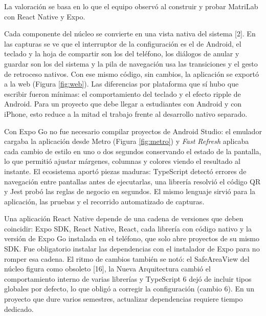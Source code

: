 \clearpage
{}

La valoración se basa en lo que el equipo observó al construir y probar MatriLab con React Native y Expo.

\vspace{0.2cm}


Cada componente del núcleo se convierte en una vista nativa del sistema [2]. En las capturas se ve que el interruptor de la configuración es el de Android, el teclado y la hoja de compartir son los del teléfono, los diálogos de anular y guardar son los del sistema y la pila de navegación usa las transiciones y el gesto de retroceso nativos. Con ese mismo código, sin cambios, la aplicación se exportó a la web (Figura \ref{fig:web}). Las diferencias por plataforma que sí hubo que escribir fueron mínimas: el comportamiento del teclado y el efecto ripple de Android. Para un proyecto que debe llegar a estudiantes con Android y con iPhone, esto reduce a la mitad el trabajo frente al desarrollo nativo separado.


Con Expo Go no fue necesario compilar proyectos de Android Studio: el emulador cargaba la aplicación desde Metro (Figura \ref{fig:metro}) y \textit{Fast Refresh} aplicaba cada cambio de estilo en uno o dos segundos conservando el estado de la pantalla, lo que permitió ajustar márgenes, columnas y colores viendo el resultado al instante. El ecosistema aportó piezas maduras: TypeScript detectó errores de navegación entre pantallas antes de ejecutarlas, una librería resolvió el código QR y Jest probó las reglas de negocio en segundos. El mismo lenguaje sirvió para la aplicación, las pruebas y el recorrido automatizado de capturas.

\vspace{0.2cm}


Una aplicación React Native depende de una cadena de versiones que deben coincidir: Expo SDK, React Native, React, cada librería con código nativo y la versión de Expo Go instalada en el teléfono, que solo abre proyectos de su mismo SDK. Fue obligatorio instalar las dependencias con el instalador de Expo para no romper esa cadena. El ritmo de cambios también se notó: el SafeAreaView del núcleo figura como obsoleto [16], la Nueva Arquitectura cambió el comportamiento interno de varias librerías y TypeScript 6 dejó de incluir tipos globales por defecto, lo que obligó a corregir la configuración (cambio 6). En un proyecto que dure varios semestres, actualizar dependencias requiere tiempo dedicado.

